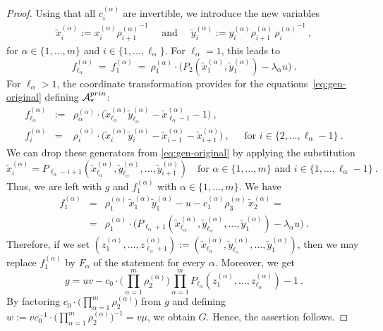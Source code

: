 \documentclass[10pt,a4paper]{amsart}
\newcommand{\cA}{\mathcal{A}}
\newcommand{\len}{\ell}
\newcommand{\prin}{{\rm prin}}
\newcommand{\tx}{\widetilde x}
\newcommand{\ty}{\widetilde y}
\begin{document}
\begin{proof}
	Using that all $ c_i^{(\alpha)} $ are invertible, 
	we introduce the new variables
	\[
	\begin{array}{lcl} 
		\tx_i^{(\alpha)}
		:= 
		x_i^{(\alpha)} {\rho_{i+1}^{(\alpha)}}^{-1}
		& \
		\mbox{ and } 
		\ & 
		\ty_i^{(\alpha)}
		:= 
		y_i^{(\alpha)} \rho_{i+1}^{(\alpha)} \, {\rho_{i}^{(\alpha)}}^{-1}
		\ ,
	\end{array}
	\]
	for $ \alpha \in \{ 1, \ldots, m \} $ and $ i \in \{ 1, \ldots, \len_\alpha  \} $. 
	For $ \ell_\alpha = 1$, this leads to
	\[
		f_{\ell_\alpha}^{(\alpha)}
		\ = \
		f_1^{(\alpha)} 
		\ = \ 
		\rho_{1}^{(\alpha)} \cdot 
		\Big( 
		P_{2} (\tx_{1}^{(\alpha)}, \ty_{1}^{(\alpha)}) 
		- 
		\lambda_\alpha u  
		\Big) \ . 		
	\]
	For $ \ell_\alpha > 1 $, the coordinate transformation
	provides
	for the equations~\eqref{eq:gen-original} defining $ \cA_\star^\prin $:
	\[
	\begin{array}{rcll}
		f_{\len_\alpha}^{(\alpha)} 
		& := &
		\rho_\alpha^{(\alpha)} \cdot 
		\Big( 
		\tx_{\len_\alpha}^{(\alpha)} \ty_{\len_\alpha}^{(\alpha)} - \tx_{\len_\alpha-1}^{(\alpha)} - 1 
		\Big)   
		\ , 
		\\[10pt]
		f_{i}^{(\alpha)} 
		& = &
		\rho_{i}^{(\alpha)} \cdot 
		\Big(
		\tx_i^{(\alpha)} \ty_i^{(\alpha)} - \tx_{i-1}^{(\alpha)} - \tx_{i+1}^{(\alpha)} 
		\Big) 
		 \ ,
		&
		\ \ \ 
		\mbox{for } i \in \{ 2, \ldots, \len_\alpha - 1 \} \ .
	\end{array}
	\]
	We can drop these generators from \eqref{eq:gen-original}
	by applying the substitution
	\[
		\tx_i^{(\alpha)} 
		= 
		P_{\len_\alpha - i + 1 } (\tx_{\len_\alpha}^{(\alpha)}, \ty_{\len_\alpha}^{(\alpha)}, \ldots, \ty_{i + 1}^{(\alpha)}) 
		\ \ \
		\mbox{ for } 
		\alpha \in \{ 1, \ldots, m \}
		\mbox{ and }
		i \in \{ 1, \ldots, \len_\alpha-1\} 
		\ .
	\]
	Thus, we are left with $ g $ and 
	$ f_1^{(\alpha)} $ with $ \alpha \in \{ 1, \ldots, m \} $. 
	We have 
	\[
	\begin{array}{rcl}
		f_1^{(\alpha)} 
		& = & 
		\rho_{1}^{(\alpha)}
		\, \tx_{1}^{(\alpha)} \ty_{1}^{(\alpha)} - u - c_1^{(\alpha)} \rho_3^{(\alpha)}   \, \tx_{2}^{(\alpha)}  
		=
		\\[10pt]
		& = &
		\rho_{1}^{(\alpha)} \cdot 
		\Big( 
		P_{\len_\alpha+1} (\tx_{\len_\alpha}^{(\alpha)}, \ty_{\len_\alpha}^{(\alpha)}, \ldots, \ty_{1}^{(\alpha)}) 
		- 
		\lambda_\alpha u  
		\Big) \ . 
	\end{array} 
	\]
	Therefore, if we set
	$ ( z_1^{(\alpha)}, \ldots, z_{\len_\alpha + 1}^{(\alpha)} ) := (\tx_{\len_\alpha}^{(\alpha)}, \ty_{\len_\alpha}^{(\alpha)}, \ldots, \ty_{1}^{(\alpha)}) $,
	then we may replace
	$ f_1^{(\alpha)} $ by $ F_\alpha $ of the statement for every $ \alpha $.  
	Moreover, we get
	\[
		g = u v - c_0 \cdot \Big( \prod_{\alpha=1}^m 
		\rho_{2}^{(\alpha)} \Big) 
		\prod_{\alpha=1}^m P_{\len_\alpha} ( z_1^{(\alpha)}, \ldots, z_{\len_\alpha}^{(\alpha)}) - 1 
		\ . 
	\]
	By factoring $ \displaystyle c_0 \cdot \Big( \prod_{\alpha=1}^m 
	\rho_{2}^{(\alpha)} \Big)  $ from $ g $ 
	and defining $ \displaystyle w := v c_0^{-1} \cdot \Big( \prod_{\alpha=1}^m 
	\rho_{2}^{(\alpha)} \Big)^{-1}  = v \mu  $,
	we obtain $ G $.
	Hence, the assertion follows.  
\end{proof}
\end{document}
